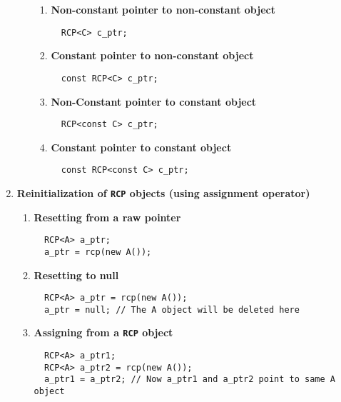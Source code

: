 \documentclass[pdf,ps2pdf,11pt]{SANDreport}
\begin{document}
\begin{enumerate}
\begin{enumerate}
\begin{enumerate}
%
\item {\bf Non-constant pointer to non-constant object }
{\small\begin{verbatim}
  RCP<C> c_ptr;
\end{verbatim}}
%
\item {\bf Constant pointer to non-constant object }
{\small\begin{verbatim}
  const RCP<C> c_ptr;
\end{verbatim}}
%
\item {\bf Non-Constant pointer to constant object }
{\small\begin{verbatim}
  RCP<const C> c_ptr;
\end{verbatim}}
%
\item {\bf Constant pointer to constant object }
{\small\begin{verbatim}
  const RCP<const C> c_ptr;
\end{verbatim}}
%
\end{enumerate}
%
\end{enumerate}

\item {\bf Reinitialization of \texttt{RCP} objects (using assignment operator)}
%
\begin{enumerate}
%
\item {\bf Resetting from a raw pointer}
%
{\small\begin{verbatim}
  RCP<A> a_ptr;
  a_ptr = rcp(new A());
\end{verbatim}}
%
\item {\bf Resetting to null}
%
{\small\begin{verbatim}
  RCP<A> a_ptr = rcp(new A());
  a_ptr = null; // The A object will be deleted here
\end{verbatim}}
%
\item {\bf Assigning from a \texttt{RCP} object}
%
{\small\begin{verbatim}
  RCP<A> a_ptr1;
  RCP<A> a_ptr2 = rcp(new A());
  a_ptr1 = a_ptr2; // Now a_ptr1 and a_ptr2 point to same A object
\end{verbatim}}
%
\end{enumerate}


\end{enumerate}
\end{document}
